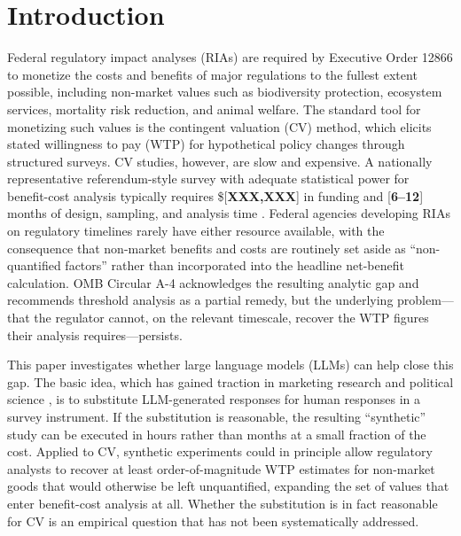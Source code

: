 \documentclass[12pt]{article}
\begin{document}
\section{Introduction}\label{sec:intro}

Federal regulatory impact analyses (RIAs) are required by Executive Order 12866 to monetize the costs and benefits of major regulations to the fullest extent possible, including non-market values such as biodiversity protection, ecosystem services, mortality risk reduction, and animal welfare. The standard tool for monetizing such values is the contingent valuation (CV) method, which elicits stated willingness to pay (WTP) for hypothetical policy changes through structured surveys. CV studies, however, are slow and expensive. A nationally representative referendum-style survey with adequate statistical power for benefit-cost analysis typically requires \$[\textbf{XXX,XXX}] in funding and [\textbf{6--12}] months of design, sampling, and analysis time \parencite{Johnston2017, Champ2017}. Federal agencies developing RIAs on regulatory timelines rarely have either resource available, with the consequence that non-market benefits and costs are routinely set aside as ``non-quantified factors'' rather than incorporated into the headline net-benefit calculation. OMB Circular A-4 acknowledges the resulting analytic gap and recommends threshold analysis as a partial remedy, but the underlying problem---that the regulator cannot, on the relevant timescale, recover the WTP figures their analysis requires---persists.

This paper investigates whether large language models (LLMs) can help close this gap. The basic idea, which has gained traction in marketing research \parencite{Brand2024, Li2024} and political science \parencite{Argyle2023, Bisbee2024}, is to substitute LLM-generated responses for human responses in a survey instrument. If the substitution is reasonable, the resulting ``synthetic'' study can be executed in hours rather than months at a small fraction of the cost. Applied to CV, synthetic experiments could in principle allow regulatory analysts to recover at least order-of-magnitude WTP estimates for non-market goods that would otherwise be left unquantified, expanding the set of values that enter benefit-cost analysis at all. Whether the substitution is in fact reasonable for CV is an empirical question that has not been systematically addressed.
\end{document}
